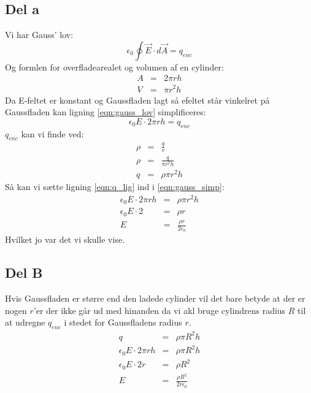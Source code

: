 \subsection{Del a} %
\label{sub:del_a}
Vi har Gauss' lov:
\begin{equation}
	\label{eqn:gauss_lov}
	\epsilon _0 \oint \vec{E} \cdot d\vec{A} = q_{enc}
\end{equation}
Og formlen for overfladearealet og volumen af en cylinder:
\begin{eqnarray}
	A &=& 2\pi rh \\
	V &=& \pi r^2 h
\end{eqnarray}
Da E-feltet er konstant og Gaussfladen lagt så efeltet står vinkelret på Gaussfladen kan ligning \ref{eqn:gauss_lov} simplificeres:
\begin{equation}
	\label{eqn:gauss_simp}
	\epsilon _0 E \cdot 2\pi rh = q_{enc}
\end{equation}
$q_{enc}$ kan vi finde ved:
\begin{eqnarray}
	\label{eqn:q_lig}
	\rho &=& \frac{q}{v} \nonumber \\
	\rho &=& \frac{q}{\pi r^2 h} \nonumber \\
	q &=& \rho \pi r^2 h
\end{eqnarray}
Så kan vi sætte ligning \ref{eqn:q_lig} ind i \ref{eqn:gauss_simp}:
\begin{eqnarray}
	\epsilon _0 E \cdot 2\pi rh &=& \rho \pi r^2 h \nonumber \\
	\epsilon _0 E \cdot 2 &=& \rho r \nonumber \\
	E &=& \frac{\rho r}{2\epsilon _0}
\end{eqnarray}
Hvilket jo var det vi skulle vise.
\newpage

\subsection{Del B} %
\label{sub:del_b}
Hvis Gaussfladen er større end den ladede cylinder vil det bare betyde at der er nogen $r$'er der ikke går ud med hinanden da vi akl bruge cylindrens radius $R$  til at udregne $q_{enc}$ i stedet for Gaussfladens radius $r$.
\begin{eqnarray}
	q &=& \rho \pi R^2 h \nonumber \\
	\epsilon _0 E \cdot 2\pi rh &=& \rho \pi R^2 h \nonumber \\
	\epsilon _0 E \cdot 2r &=& \rho R^2 \nonumber \\
	E &=& \frac{\rho R^2}{2r\epsilon _0}
\end{eqnarray}
